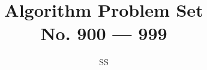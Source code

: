 \documentclass[a4paper,12pt]{article}
\title{Algorithm Problem Set \\ \large No. 900 --- 999}
\author{SS}
\begin{document}
\renewcommand{\thelstlisting}{\thesection.\arabic{lstlisting}}
\newcommand{\fcc}[1]{\lstinline[language=C++, basicstyle=\small\ttfamily, keywordstyle=\bfseries\color{green!40!black}]|#1|}
\newcommand{\fcj}[1]{\lstinline[language=Java, basicstyle=\small\ttfamily, keywordstyle=\bfseries\color{green!40!black}]|#1|}
\maketitle
%
%
%
%
%
%
%
%
%
%
%
%
%
%
%
%
%
%
%
%
%
%
%
%
%
%
%
%
%
%
%
%
%
%
%
%
%
%
%
%
%
%
%
%
%
%
%
%
%
%
%
%
%
%
%
%
%
%
%
%
%
%
%
%
%
%
%
%
%
%
%
%
%
%
%
%
%
%
%
%
%
%
%
%
%
%
%
%
%
%
%
%
%
%

%
%

%
%
\end{document}
